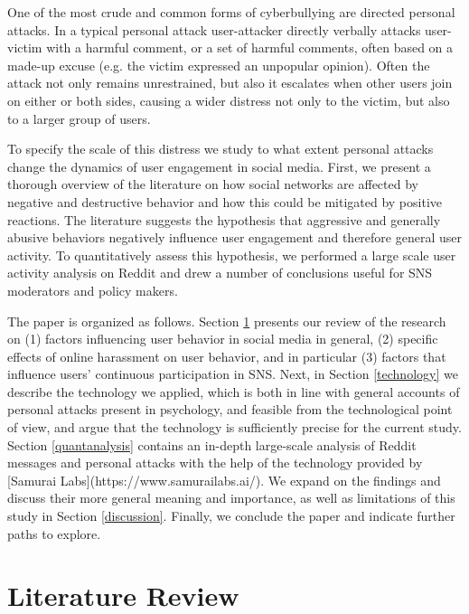 \documentclass[a4paper,fleqn]{cas-dc}
\begin{document}
One of the most crude and common forms of cyberbullying are directed personal attacks. In a typical personal attack user-attacker directly verbally attacks user-victim with a harmful comment, or a set of harmful comments, often based on a made-up excuse (e.g. the victim expressed an unpopular opinion). Often the attack not only remains unrestrained, but also it escalates when other users join on either or both sides, causing a wider distress not only to the victim, but also to a larger group of users. 





To specify the scale of this distress we study to what extent personal attacks change the dynamics of user engagement in social media. 
First, we present a thorough overview of the literature  on how social networks are affected by negative and destructive behavior and how this could be mitigated by positive reactions. The literature suggests the hypothesis that aggressive and generally abusive behaviors negatively influence user engagement and therefore general user activity. To quantitatively assess this hypothesis, we performed a large scale user activity analysis on Reddit and drew a number of conclusions useful for SNS moderators and policy makers.


The paper is organized as follows.
Section \ref{literaturereview} presents our review of the research on (1)  factors influencing user behavior in social media in general, (2) specific effects of online harassment on user behavior, and in particular (3) factors that influence users' continuous participation in SNS. 
Next, in Section \ref{technology} we describe the technology we applied, which is both in line with general accounts of personal attacks present in psychology, and feasible from the technological point of view, and argue that the technology is sufficiently precise for the current study. Section \ref{quantanalysis} contains an in-depth large-scale analysis of Reddit messages and personal attacks  with the help of the technology provided by [\textsf{Samurai Labs}](https://www.samurailabs.ai/). We expand on the findings and discuss their more general meaning and importance, as well as limitations of this study in Section \ref{discussion}. Finally,  we conclude the paper and indicate  further paths to explore.




\section{Literature Review}
\label{literaturereview}
\end{document}
